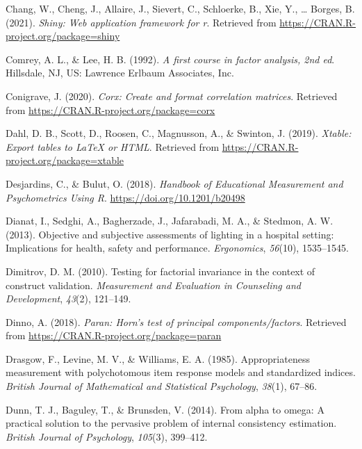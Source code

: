 \documentclass[
  english,
  man]{apa6}
\newlength{\cslhangindent}
\newlength{\cslentryspacingunit} %
\newenvironment{CSLReferences}[2] %
 {%
  \setlength{\parindent}{0pt}
  \ifodd #1
  \let\oldpar\par
  \def\par{\hangindent=\cslhangindent\oldpar}
  \fi
  \setlength{\parskip}{#2\cslentryspacingunit}
 }%
 {}
\begin{document}
\begin{CSLReferences}{1}{0}
\leavevmode{}%
Chang, W., Cheng, J., Allaire, J., Sievert, C., Schloerke, B., Xie, Y., \ldots{} Borges, B. (2021). \emph{Shiny: Web application framework for r}. Retrieved from \url{https://CRAN.R-project.org/package=shiny}

\leavevmode{}%
Comrey, A. L., \& Lee, H. B. (1992). \emph{A first course in factor analysis, 2nd ed}. {Hillsdale, NJ, US}: {Lawrence Erlbaum Associates, Inc}.

\leavevmode{}%
Conigrave, J. (2020). \emph{Corx: Create and format correlation matrices}. Retrieved from \url{https://CRAN.R-project.org/package=corx}

\leavevmode{}%
Dahl, D. B., Scott, D., Roosen, C., Magnusson, A., \& Swinton, J. (2019). \emph{Xtable: Export tables to LaTeX or HTML}. Retrieved from \url{https://CRAN.R-project.org/package=xtable}

\leavevmode{}%
Desjardins, C., \& Bulut, O. (2018). \emph{Handbook of {Educational Measurement} and {Psychometrics Using R}}. \url{https://doi.org/10.1201/b20498}

\leavevmode{}%
Dianat, I., Sedghi, A., Bagherzade, J., Jafarabadi, M. A., \& Stedmon, A. W. (2013). Objective and subjective assessments of lighting in a hospital setting: Implications for health, safety and performance. \emph{Ergonomics}, \emph{56}(10), 1535--1545.

\leavevmode{}%
Dimitrov, D. M. (2010). Testing for factorial invariance in the context of construct validation. \emph{Measurement and Evaluation in Counseling and Development}, \emph{43}(2), 121--149.

\leavevmode{}%
Dinno, A. (2018). \emph{Paran: Horn's test of principal components/factors}. Retrieved from \url{https://CRAN.R-project.org/package=paran}

\leavevmode{}%
Drasgow, F., Levine, M. V., \& Williams, E. A. (1985). Appropriateness measurement with polychotomous item response models and standardized indices. \emph{British Journal of Mathematical and Statistical Psychology}, \emph{38}(1), 67--86.

\leavevmode{}%
Dunn, T. J., Baguley, T., \& Brunsden, V. (2014). From alpha to omega: A practical solution to the pervasive problem of internal consistency estimation. \emph{British Journal of Psychology}, \emph{105}(3), 399--412.


\end{CSLReferences}
\end{document}
